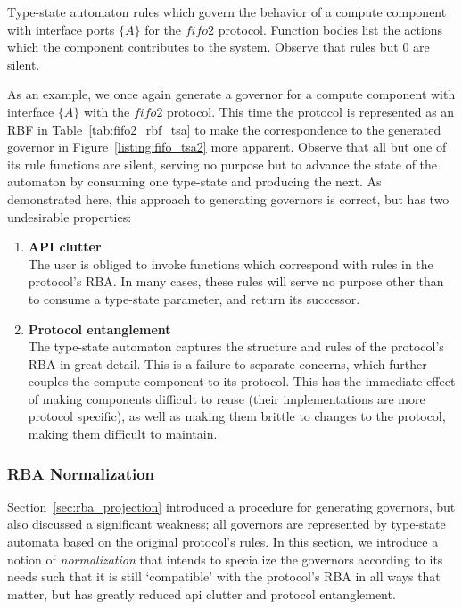 \begin{listing}[ht]
	\inputminted[]{rust}{fifo_tsa_2.rs}
	\caption[Type state automaton in Rust with silent rules.]{Type-state automaton rules which govern the behavior of a compute component with interface ports $\{A\}$ for the $fifo2$ protocol. Function bodies list the actions which the component contributes to the system. Observe that rules but 0 are silent.}
	\label{listing:fifo_tsa2}
\end{listing}

As an example, we once again generate a governor for a compute component with interface $\{A\}$ with the $fifo2$ protocol. This time the protocol is represented as an RBF in Table~\ref{tab:fifo2_rbf_tsa} to make the correspondence to the generated governor in Figure~\ref{listing:fifo_tsa2} more apparent. Observe that all but one of its rule functions are silent, serving no purpose but to advance the state of the automaton by consuming one type-state and producing the next. As demonstrated here, this approach to generating governors is correct, but has two undesirable properties:
\begin{enumerate}
	\item \textbf{API clutter}\\
	The user is obliged to invoke functions which correspond with rules in the protocol's RBA. In many cases, these rules will serve no purpose other than to consume a type-state parameter, and return its successor.
	
	\item \textbf{Protocol entanglement}\\
	The type-state automaton captures the structure and rules of the protocol's RBA in great detail. This is a failure to separate concerns, which further couples the compute component to its protocol. This has the immediate effect of making components difficult to reuse (their implementations are more protocol specific), as well as making them brittle to changes to the protocol, making them difficult to maintain. 
	
\end{enumerate}

\subsubsection{RBA Normalization}
\label{sec:rba_normalization}
Section~\ref{sec:rba_projection} introduced a procedure for generating governors, but also discussed a significant weakness; all governors are represented by type-state automata based on the original protocol's rules. In this section, we introduce a notion of \textit{normalization} that intends to specialize the governors according to its needs such that it is still `compatible' with the protocol's RBA in all ways that matter, but has greatly reduced api clutter and protocol entanglement. 

